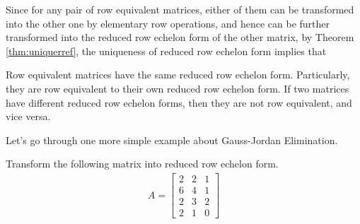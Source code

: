 Since for any pair of row equivalent matrices, either of them can be transformed into the other one by elementary row operations, and hence can be further transformed into the reduced row echelon form of the other matrix, by Theorem \ref{thm:uniquerref}, the uniqueness of reduced row echelon form implies that
\begin{proper}
\label{proper:rowequivreduce}
Row equivalent matrices have the same reduced row echelon form. Particularly, they are row equivalent to their own reduced row echelon form. If two matrices have different reduced row echelon forms, then they are not row equivalent, and vice versa.
\end{proper}
Let's go through one more simple example about Gauss-Jordan Elimination.
\begin{exmp}
\label{exmp:rref2}
Transform the following matrix into reduced row echelon form.
\begin{align*}
A =
\begin{bmatrix}
2 & 2 & 1 \\
6 & 4 & 1 \\
2 & 3 & 2 \\
2 & 1 & 0
\end{bmatrix}    
\end{align*}
\end{exmp}
